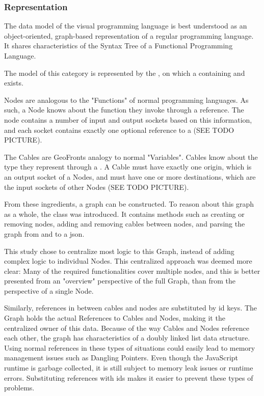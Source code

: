 \subsubsection*{ Representation }
The data model of the visual programming language is best understood as an object-oriented, graph-based representation of a regular programming language. It shares characteristics of the Syntax Tree of a Functional Programming Language.

The model of this category is represented by the , on which a  containing  and  exists. 

Nodes are analogous to the "Functions" of normal programming languages.
As such, a Node knows about the function they invoke through a  reference. The node contains a number of input and output sockets based on this information, and each socket contains exactly one optional reference to a  (SEE TODO PICTURE).  

The Cables are GeoFronts analogy to normal "Variables". Cables know about the type they represent through a . A Cable must have exactly one origin, which is an output socket of a Nodes, and must have one or more destinations, which are the input sockets of other Nodes (SEE TODO PICTURE).

From these ingredients, a graph can be constructed. 
To reason about this graph as a whole, the  class was introduced. 
It contains methods such as creating or removing nodes, adding and removing cables between nodes, and parsing the graph from and to a json. 

This study chose to centralize most logic to this Graph, instead of adding complex logic to individual Nodes. 
This centralized approach was deemed more clear: Many of the required functionalities cover multiple nodes, and this is better presented from an "overview" perspective of the full Graph, than from the perspective of a single Node. 

Similarly, references in between cables and nodes are substituted by id keys. The Graph holds the actual References to Cables and Nodes, making it the centralized owner of this data.
Because of the way Cables and Nodes reference each other, the graph has characteristics of a doubly linked list data structure. Using normal references in these types of situations could easily lead to memory management issues such as Dangling Pointers. Even though the JavaScript runtime is garbage collected, it is still subject to memory leak issues or runtime errors. Substituting references with ids makes it easier to prevent these types of problems. 


